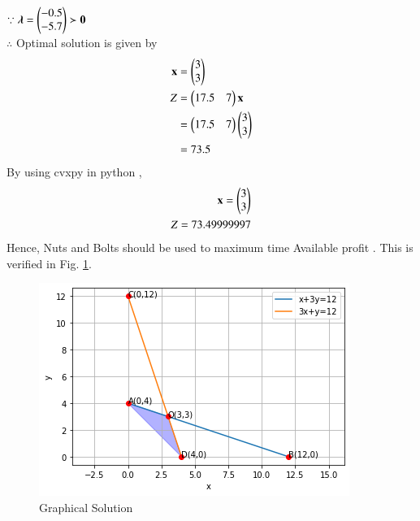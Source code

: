 $\because \boldsymbol{\lambda}=\begin{pmatrix}-0.5 \\ -5.7\end{pmatrix} \succ \mathbf{0} $
\\
$\therefore$ Optimal solution is given by
\begin{align}
    \mathbf{x} &= \begin{pmatrix}3\\3\end{pmatrix} \\
    Z &= \begin{pmatrix}17.5 & 7\end{pmatrix}\mathbf{x} \\
    &= \begin{pmatrix}17.5 & 7\end{pmatrix}\begin{pmatrix}3 \\ 3\end{pmatrix} \\
    &= 73.5
\end{align}
By using cvxpy in python ,
\begin{align}
    \mathbf{x}=\begin{pmatrix}3\\3\end{pmatrix}\\
    Z = 73.49999997
\end{align}
Hence, Nuts and  Bolts should be used to maximum time Available profit .  This is verified in Fig. 
\ref{opt/15/fig: Graphical Solution}.	
\begin{figure}[!ht]
\centering
\includegraphics[width=\columnwidth]{solutions/su2021/2/15/download (2).png}
\caption{Graphical Solution}
\label{opt/15/fig: Graphical Solution}	
\end{figure}
